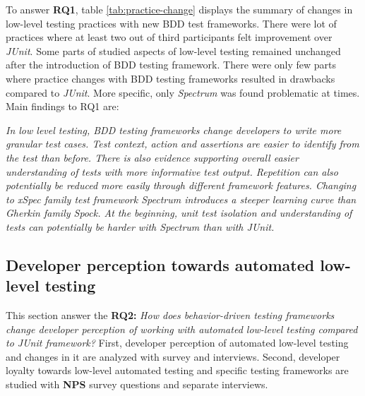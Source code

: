 To answer \textbf{RQ1}, table \ref{tab:practice-change} displays the summary of changes in low-level testing practices with new BDD test
frameworks. There were lot of practices where at least two out of third participants felt improvement over \textit{JUnit}.
Some parts of studied aspects of low-level testing remained unchanged after the introduction of BDD testing framework.
There were only few parts where practice changes with BDD testing frameworks resulted in drawbacks compared to \textit{JUnit}. More
specific, only \textit{Spectrum} was found problematic at times. Main findings to RQ1 are:

\vskip 1mm
\begin{topbot}
\textit{In low level testing, BDD testing frameworks change developers to write more granular test cases. Test
context, action and assertions are easier to identify from the test than before. There is also evidence supporting
overall easier understanding of tests with more informative test output. Repetition can also potentially be reduced more easily through
different framework features.
\newline\newline Changing to xSpec family test framework Spectrum introduces a steeper learning curve than Gherkin family Spock.
At the beginning, unit test isolation and understanding of tests can potentially be harder with Spectrum than with JUnit.}
\end{topbot}

\clearpage


\subsection{Developer perception towards automated low-level testing}
This section answer the
\textbf{RQ2: }\textit{How does behavior-driven testing frameworks change developer perception of working with automated low-level
testing compared to \textit{JUnit} framework?} First, developer perception of automated low-level testing and changes in it are
analyzed with survey and interviews. Second, developer loyalty towards low-level automated testing and specific testing
frameworks are studied with \textbf{NPS} survey questions and separate interviews.

